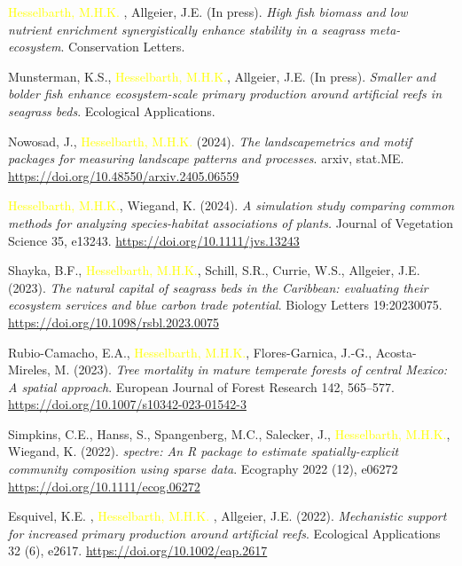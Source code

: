 \documentclass[hidelinks]{report}
\begin{document}
\begin{hangparas}{7.5mm}{1}
	
\textcolor{yellow}{Hesselbarth, M.H.K.} \textcolor{grey}{\Cross}, Allgeier, J.E. \textcolor{grey}{\Cross} (In press). \textit{High fish biomass and low nutrient enrichment synergistically enhance stability in a seagrass meta-ecosystem}. Conservation Letters.	

Munsterman, K.S., \textcolor{yellow}{Hesselbarth, M.H.K.}, Allgeier, J.E. (In press). \textit{Smaller and bolder fish enhance ecosystem-scale primary production around artificial reefs in seagrass beds}. Ecological Applications. %
		
Nowosad, J., \textcolor{yellow}{Hesselbarth, M.H.K.} (2024). \textit{The landscapemetrics and motif packages for measuring landscape patterns and processes}. arxiv, stat.ME. \url{https://doi.org/10.48550/arxiv.2405.06559}

\textcolor{yellow}{Hesselbarth, M.H.K.}, Wiegand, K. (2024). \textit{A simulation study comparing common methods for analyzing species-habitat associations of plants.} Journal of Vegetation Science 35, e13243. \url{https://doi.org/10.1111/jvs.13243}
	
Shayka, B.F., \textcolor{yellow}{Hesselbarth, M.H.K.}, Schill, S.R., Currie, W.S., Allgeier, J.E. (2023). \textit{The natural capital of seagrass beds in the Caribbean: evaluating their ecosystem services and blue carbon trade potential}. Biology Letters 19:20230075. \url{https://doi.org/10.1098/rsbl.2023.0075}
	
Rubio-Camacho, E.A., \textcolor{yellow}{Hesselbarth, M.H.K.}, Flores-Garnica, J.-G., Acosta-Mireles, M. (2023). \textit{Tree mortality in mature temperate forests of central Mexico: A spatial approach}. European Journal of Forest Research 142, 565–577. \url{https://doi.org/10.1007/s10342-023-01542-3}

Simpkins, C.E., Hanss, S., Spangenberg, M.C., Salecker, J., \textcolor{yellow}{Hesselbarth, M.H.K.}, Wiegand, K. (2022). \textit{spectre: An R package to estimate spatially-explicit community composition using sparse data}. Ecography 2022 (12), e06272 \url{https://doi.org/10.1111/ecog.06272}

Esquivel, K.E. \textcolor{grey}{\Cross}, \textcolor{yellow}{Hesselbarth, M.H.K.} \textcolor{grey}{\Cross}, Allgeier, J.E. (2022). \textit{Mechanistic support for increased primary production around artificial reefs}. Ecological Applications 32 (6), e2617. \url{https://doi.org/10.1002/eap.2617}


\end{hangparas}
\end{document}
